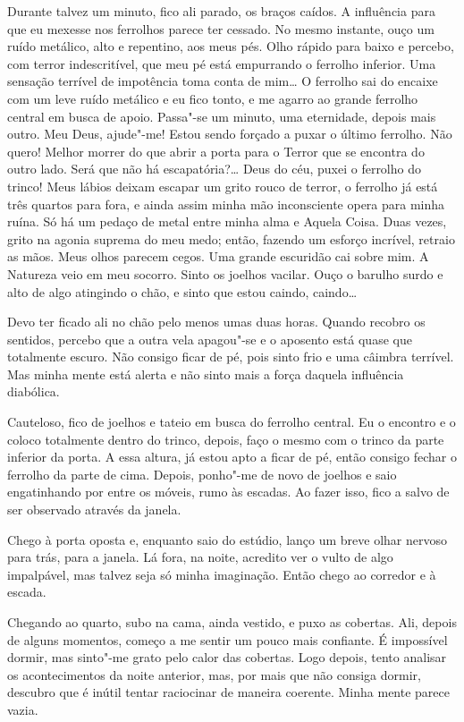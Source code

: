 Durante talvez um minuto, fico ali parado, os braços caídos. A influência para que eu mexesse nos ferrolhos parece ter
cessado. No mesmo instante, ouço um ruído metálico, alto e repentino, aos meus pés. Olho rápido para baixo e percebo,
com terror indescritível, que meu pé está empurrando o ferrolho inferior. Uma sensação terrível de impotência toma
conta de mim\ldots{} O ferrolho sai do encaixe com um leve ruído metálico e eu fico tonto, e me agarro ao grande ferrolho
central em busca de apoio. Passa"-se um minuto, uma eternidade, depois mais outro. Meu Deus, ajude"-me! Estou sendo
forçado a puxar o último ferrolho. Não quero! Melhor morrer do que abrir a porta para o Terror que se encontra do outro
lado. Será que não há escapatória?\ldots{} Deus do céu, puxei o ferrolho do trinco! Meus lábios deixam escapar um grito
rouco de terror, o ferrolho já está três quartos para fora, e ainda assim minha mão inconsciente opera para minha
ruína. Só há um pedaço de metal entre minha alma e Aquela Coisa. Duas vezes, grito na agonia suprema do meu medo;
então, fazendo um esforço incrível, retraio as mãos. Meus olhos parecem cegos. Uma grande escuridão cai sobre mim. A
Natureza veio em meu socorro. Sinto os joelhos vacilar. Ouço o barulho surdo e alto de algo atingindo o chão, e sinto
que estou caindo, caindo\ldots{}

Devo ter ficado ali no chão pelo menos umas duas horas. Quando recobro os sentidos, percebo que a outra vela apagou"-se
e o aposento está quase que totalmente escuro. Não consigo ficar de pé, pois sinto frio e uma câimbra terrível. Mas
minha mente está alerta e não sinto mais a força daquela influência diabólica.

Cauteloso, fico de joelhos e tateio em busca do ferrolho central. Eu o encontro e o coloco totalmente dentro do
trinco, depois, faço o mesmo com o trinco da parte inferior da porta. A essa altura, já estou apto a ficar de pé, então
consigo fechar o ferrolho da parte de cima. Depois, ponho"-me de novo de joelhos e saio engatinhando por entre os
móveis, rumo às escadas. Ao fazer isso, fico a salvo de ser observado através da janela.

Chego à porta oposta e, enquanto saio do estúdio, lanço um breve olhar nervoso para trás, para a janela. Lá fora, na
noite, acredito ver o vulto de algo impalpável, mas talvez seja só minha imaginação. Então chego ao corredor e à
escada.

Chegando ao quarto, subo na cama, ainda vestido, e puxo as cobertas. Ali, depois de alguns momentos, começo a me sentir
um pouco mais confiante. É impossível dormir, mas sinto"-me grato pelo calor das cobertas. Logo depois, tento analisar
os acontecimentos da noite anterior, mas, por mais que não consiga dormir, descubro que é inútil tentar raciocinar de
maneira coerente. Minha mente parece vazia.

